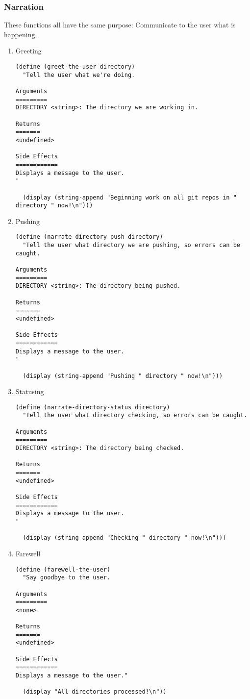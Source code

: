 \documentclass[11pt]{article}
\begin{document}
\subsubsection{Narration}
\label{sec:org07c34bd}
These functions all have the same purpose: Communicate to the user what is
happening.

\begin{enumerate}
\item Greeting
\label{sec:orge02f7eb}

\begin{verbatim}
(define (greet-the-user directory)
  "Tell the user what we're doing.

Arguments
=========
DIRECTORY <string>: The directory we are working in.

Returns
=======
<undefined>

Side Effects
============
Displays a message to the user.
"

  (display (string-append "Beginning work on all git repos in " directory " now!\n")))
\end{verbatim}

\item Pushing
\label{sec:org53f983e}
\begin{verbatim}
(define (narrate-directory-push directory)
  "Tell the user what directory we are pushing, so errors can be caught.

Arguments
=========
DIRECTORY <string>: The directory being pushed.

Returns
=======
<undefined>

Side Effects
============
Displays a message to the user.
"

  (display (string-append "Pushing " directory " now!\n")))
\end{verbatim}

\item Statusing
\label{sec:orgad30621}
\begin{verbatim}
(define (narrate-directory-status directory)
  "Tell the user what directory checking, so errors can be caught.

Arguments
=========
DIRECTORY <string>: The directory being checked.

Returns
=======
<undefined>

Side Effects
============
Displays a message to the user.
"

  (display (string-append "Checking " directory " now!\n")))

\end{verbatim}

\item Farewell
\label{sec:orgdd474ca}
\begin{verbatim}
(define (farewell-the-user)
  "Say goodbye to the user.

Arguments
=========
<none>

Returns
=======
<undefined>

Side Effects
============
Displays a message to the user."

  (display "All directories processed!\n"))
\end{verbatim}
\end{enumerate}
\end{document}
